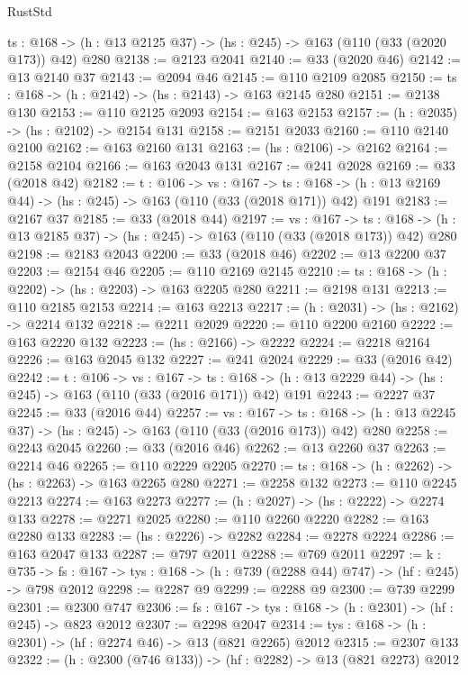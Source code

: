 \begin{lexlean}{RustStd}
\begin{coremodule}
  {ts : @168} -> (h : @13 @2125 @37) -> (hs : @245) -> @163 (@110 (@33 (@2020 @173)) @42) @280
@2138 := @2123 @2041
@2140 := @33 (@2020 @46)
@2142 := @13 @2140 @37
@2143 := @2094 @46
@2145 := @110 @2109 @2085
@2150 := {ts : @168} -> (h : @2142) -> (hs : @2143) -> @163 @2145 @280
@2151 := @2138 @130
@2153 := @110 @2125 @2093
@2154 := @163 @2153
@2157 := (h : @2035) -> (hs : @2102) -> @2154 @131
@2158 := @2151 @2033
@2160 := @110 @2140 @2100
@2162 := @163 @2160 @131
@2163 := (hs : @2106) -> @2162
@2164 := @2158 @2104
@2166 := @163 @2043 @131
@2167 := @241 @2028
@2169 := @33 (@2018 @42)
@2182 := {t : @106} ->
  {vs : @167} ->
  {ts : @168} -> (h : @13 @2169 @44) -> (hs : @245) -> @163 (@110 (@33 (@2018 @171)) @42) @191
@2183 := @2167 @37
@2185 := @33 (@2018 @44)
@2197 := {vs : @167} ->
  {ts : @168} -> (h : @13 @2185 @37) -> (hs : @245) -> @163 (@110 (@33 (@2018 @173)) @42) @280
@2198 := @2183 @2043
@2200 := @33 (@2018 @46)
@2202 := @13 @2200 @37
@2203 := @2154 @46
@2205 := @110 @2169 @2145
@2210 := {ts : @168} -> (h : @2202) -> (hs : @2203) -> @163 @2205 @280
@2211 := @2198 @131
@2213 := @110 @2185 @2153
@2214 := @163 @2213
@2217 := (h : @2031) -> (hs : @2162) -> @2214 @132
@2218 := @2211 @2029
@2220 := @110 @2200 @2160
@2222 := @163 @2220 @132
@2223 := (hs : @2166) -> @2222
@2224 := @2218 @2164
@2226 := @163 @2045 @132
@2227 := @241 @2024
@2229 := @33 (@2016 @42)
@2242 := {t : @106} ->
  {vs : @167} ->
  {ts : @168} -> (h : @13 @2229 @44) -> (hs : @245) -> @163 (@110 (@33 (@2016 @171)) @42) @191
@2243 := @2227 @37
@2245 := @33 (@2016 @44)
@2257 := {vs : @167} ->
  {ts : @168} -> (h : @13 @2245 @37) -> (hs : @245) -> @163 (@110 (@33 (@2016 @173)) @42) @280
@2258 := @2243 @2045
@2260 := @33 (@2016 @46)
@2262 := @13 @2260 @37
@2263 := @2214 @46
@2265 := @110 @2229 @2205
@2270 := {ts : @168} -> (h : @2262) -> (hs : @2263) -> @163 @2265 @280
@2271 := @2258 @132
@2273 := @110 @2245 @2213
@2274 := @163 @2273
@2277 := (h : @2027) -> (hs : @2222) -> @2274 @133
@2278 := @2271 @2025
@2280 := @110 @2260 @2220
@2282 := @163 @2280 @133
@2283 := (hs : @2226) -> @2282
@2284 := @2278 @2224
@2286 := @163 @2047 @133
@2287 := @797 @2011
@2288 := @769 @2011
@2297 := {k : @735} ->
  {fs : @167} -> {tys : @168} -> (h : @739 (@2288 @44) @747) -> (hf : @245) -> @798 @2012
@2298 := @2287 @9
@2299 := @2288 @9
@2300 := @739 @2299
@2301 := @2300 @747
@2306 := {fs : @167} -> {tys : @168} -> (h : @2301) -> (hf : @245) -> @823 @2012
@2307 := @2298 @2047
@2314 := {tys : @168} -> (h : @2301) -> (hf : @2274 @46) -> @13 (@821 @2265) @2012
@2315 := @2307 @133
@2322 := (h : @2300 (@746 @133)) -> (hf : @2282) -> @13 (@821 @2273) @2012

\end{coremodule}
\end{lexlean}
